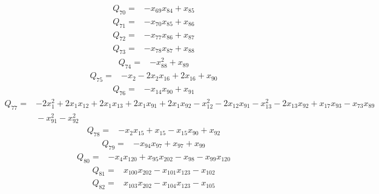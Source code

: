 {\begin{align*}
 Q_{70}={}&-x_{69}x_{84} +x_{85}
\end{align*}
\begin{align*}
 Q_{71}={}&-x_{70}x_{85} +x_{86}
\end{align*}
\begin{align*}
 Q_{72}={}&-x_{77}x_{86} +x_{87}
\end{align*}
\begin{align*}
 Q_{73}={}&-x_{78}x_{87} +x_{88}
\end{align*}
\begin{align*}
 Q_{74}={}&-x_{88}^{2} +x_{89}
\end{align*}
\begin{align*}
 Q_{75}={}&-x_{2} -2x_{2}x_{16} +2x_{16} +x_{90}
\end{align*}
\begin{align*}
 Q_{76}={}&-x_{14}x_{90} +x_{91}
\end{align*}
\begin{align*}
 Q_{77}={}&-2x_{1}^{2} +2x_{1}x_{12} +2x_{1}x_{13} +2x_{1}x_{91} +2x_{1}x_{92} -x_{12}^{2} -2x_{12}x_{91} -x_{13}^{2} -2x_{13}x_{92} +x_{17}x_{93} -x_{73}x_{89}\\
 &{}-x_{91}^{2} -x_{92}^{2}
\end{align*}
\begin{align*}
 Q_{78}={}&-x_{2}x_{15} +x_{15} -x_{15}x_{90} +x_{92}
\end{align*}
\begin{align*}
 Q_{79}={}&-x_{94}x_{97} +x_{97} +x_{99}
\end{align*}
\begin{align*}
 Q_{80}={}&-x_{4}x_{120} +x_{95}x_{202} -x_{98} -x_{99}x_{120}
\end{align*}
\begin{align*}
 Q_{81}={}&x_{100}x_{202} -x_{101}x_{123} -x_{102}
\end{align*}
\begin{align*}
 Q_{82}={}&x_{103}x_{202} -x_{104}x_{123} -x_{105}
\end{align*}
}
